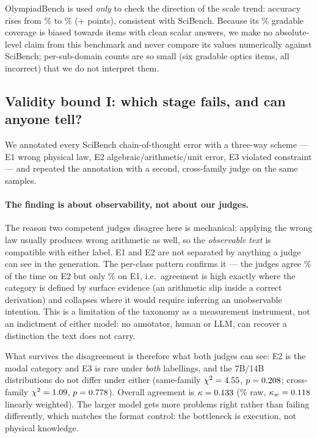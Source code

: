 \documentclass[10pt,letterpaper]{article}
\begin{document}
OlympiadBench is used \emph{only} to check the direction of the scale trend:
accuracy rises from \accOlySevenB\% to \accOlyFourteenB\% (+\gapOlyFourteenVsSeven{}
points), consistent with SciBench. Because its \pctOlympiadScorable\% gradable
coverage is biased towards items with clean scalar answers, we make no
absolute-level claim from this benchmark and never compare its values numerically
against SciBench; per-sub-domain counts are so small (six gradable optics items,
all incorrect) that we do not interpret them.

\subsection{Validity bound I: which stage fails, and can anyone tell?}
\label{sec:errors}
We annotated every SciBench chain-of-thought error with a three-way scheme --- E1
wrong physical law, E2 algebraic/arithmetic/unit error, E3 violated constraint ---
and repeated the annotation with a second, cross-family judge on the same samples.



\paragraph{The finding is about observability, not about our judges.}
The reason two competent judges disagree here is mechanical: applying the wrong law
usually produces wrong arithmetic as well, so the \emph{observable text} is
compatible with either label. E1 and E2 are not separated by anything a judge can
see in the generation. The per-class pattern confirms it --- the judges agree
\pctAgreeEtwo\% of the time on E2 but only \pctAgreeEone\% on E1, i.e.\ agreement is
high exactly where the category is defined by surface evidence (an arithmetic slip
inside a correct derivation) and collapses where it would require inferring an
unobservable intention. This is a limitation of the taxonomy as a measurement
instrument, not an indictment of either model: no annotator, human or LLM, can
recover a distinction the text does not carry.

What survives the disagreement is therefore what both judges can see: E2 is the
modal category and E3 is rare under \emph{both} labellings, and the 7B/14B
distributions do not differ under either (same-family
$\chi^2=4.55$, $p=0.208$; cross-family
$\chi^2=1.09$, $p=0.778$). Overall agreement is
$\kappa=0.133$ (\pctAgreeAnnotators\% raw,
$\kappa_w=0.118$ linearly weighted). The larger model gets more
problems right rather than failing differently, which matches the format control:
the bottleneck is execution, not physical knowledge.
\end{document}
